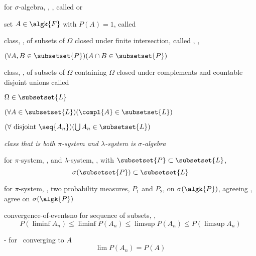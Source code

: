 \documentclass[17pt,landscape]{foils}
\begin{document}
{\vitem
	for $\sigma$-algebra, , ,
	called  or %

\vitem set $A\in\algk{F}$ with $P(A)=1$,
	called %
\eit


%

\bit
\item
	class, , of subsets of $\Omega$ closed under finite intersection,
	called , \ie,%
	\bit
	\item
		$(\forall A,B\in \subsetset{P})(A\cap B\in\subsetset{P})$
	\eit


\vitem
	class, , of subsets of $\Omega$ containing $\Omega$
	closed under complements and countable disjoint unions
	called %
	\bit
	\item
		$\Omega \in \subsetset{L}$
	\item
		$(\forall A\in \subsetset{L})(\compl{A}\in\subsetset{L})$
	\item
		$(\forall \mbox{ disjoint }\seq{A_n})(\bigcup A_n \in \subsetset{L})$
	\eit

\vitem
	\emph{class that is both $\pi$-system and $\lambda$-system is $\sigma$-algebra}%

\vitem
	for $\pi$-system, , and $\lambda$-system, ,
	with $\subsetset{P} \subset \subsetset{L}$,%
	\[
		\sigma(\subsetset{P}) \subset \subsetset{L}
	\]

\vitem
	for $\pi$-system, ,
	two probability measures, $P_1$ and $P_2$, on $\sigma(\algk{P})$,
	agreeing ,
	agree on $\sigma(\algk{P})$\
\eit



	\begin{mytheorem}{convergence-of-events}{no}{}%
	for sequence of subsets, ,
		$$
		P(\liminf A_n) \leq \liminf P(A_n) \leq \limsup P(A_n) \leq P(\limsup A_n)
		$$
	\bit
	\item [-]
		for \ converging to $A$
		$$
			\lim P(A_n) = P(A)
		$$
	\eit
	\end{mytheorem}

}
\end{document}
